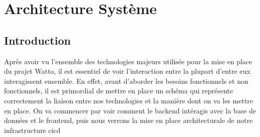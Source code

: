 \documentclass[../main.tex]{subfiles}
\begin{document}
\section{Architecture Système}
    \subsection{Introduction}
    Après avoir vu l'ensemble des technologies majeurs utilisée pour la mise en place du projet Watto, il est essentiel de voir l'interaction entre la plupart d'entre eux interagissent ensemble. 
    \newline En effet, avant d'aborder les besoins fonctionnels et non fonctionnels, il est primordial de mettre en place un schéma qui représente correctement la liaison entre nos technologies et la manière dont on va les mettre en place. 
    \newline On va commencer par voir comment le backend intéragis avec la base de données et le frontend, puis nous verrons la mise en place architecturale de notre infrastructure \acrshort{cicd}
    
    \newline 
\end{document}
